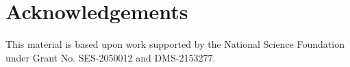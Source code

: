 \documentclass[sn-basic]{sn-jnl}
\theoremstyle{thmstyleone}
\begin{document}
%         












\section*{Acknowledgements}
This material is based upon work supported by the National Science Foundation under Grant No. SES-2050012 and DMS-2153277.

%

\end{document}
